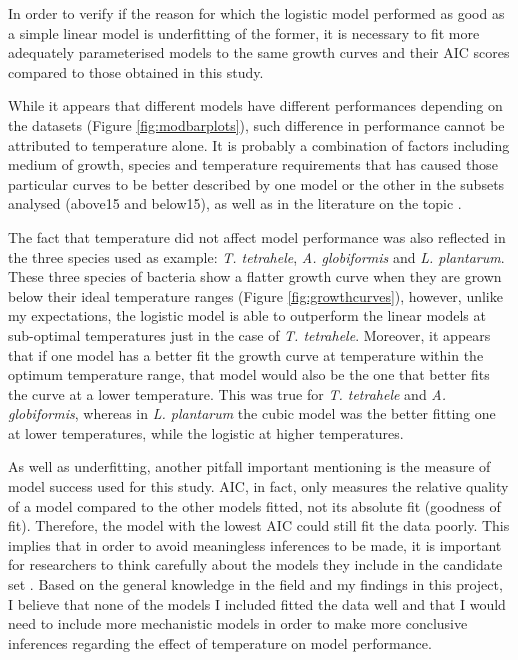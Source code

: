 \documentclass[a4paper]{article}
\begin{document}
In order to verify if the reason for which the logistic model performed as good as a simple linear model is underfitting of the former, it is necessary to fit more adequately parameterised models to the same growth curves and their AIC scores compared to those obtained in this study. \par

While it appears that different models have different performances depending on the datasets (Figure \ref{fig:modbarplots}), such difference in performance cannot be attributed to temperature alone. It is probably a combination of factors including medium of growth, species and temperature requirements that has caused those particular curves to be better described by one model or the other in the subsets analysed (above15 and below15), as well as in the literature on the topic \citep{pla2015comparison}.\par

The fact that temperature did not affect model performance was also reflected in the three species used as example: \textit{T. tetrahele}, \textit{A. globiformis} and \textit{L. plantarum}. These three species of bacteria show a flatter growth curve when they are grown below their ideal temperature ranges (Figure \ref{fig:growthcurves}), however, unlike my expectations, the logistic model is able to outperform the linear models at sub-optimal temperatures just in the case of \textit{T. tetrahele}. Moreover, it appears that if one model has a better fit the growth curve at temperature within the optimum temperature range, that model would also be the one that better fits the curve at a lower temperature. This was true for \textit{T. tetrahele} and \textit{A. globiformis}, whereas in \textit{L. plantarum} the cubic model was the better fitting one at lower temperatures, while the logistic at higher temperatures. \par

As well as underfitting, another pitfall important mentioning is the measure of model success used for this study. AIC, in fact, only measures the relative quality of a model compared to the other models fitted, not its absolute fit (goodness of fit). Therefore, the model with the lowest AIC could still fit the data poorly. This implies that in order to avoid meaningless inferences to be made, it is important for researchers to think carefully about the models they include in the candidate set \citep{johnson2004model}. Based on the general knowledge in the field and my findings in this project, I believe that none of the models I included fitted the data well and that I would need to include more mechanistic models in order to make more conclusive inferences regarding the effect of temperature on model performance. \par
\end{document}
